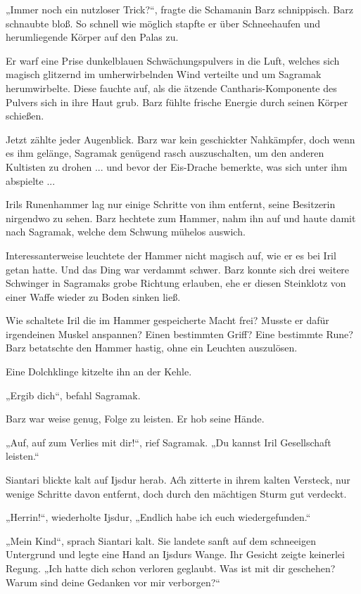 „Immer noch ein nutzloser Trick?“, fragte die Schamanin Barz schnippisch. Barz schnaubte bloß. So schnell wie möglich stapfte er über Schneehaufen und herumliegende Körper auf den Palas zu.

Er warf eine Prise dunkelblauen Schwächungspulvers in die Luft, welches sich magisch glitzernd im umherwirbelnden Wind verteilte und um Sagramak herumwirbelte. Diese fauchte auf, als die ätzende Cantharis-Komponente des Pulvers sich in ihre Haut grub. Barz fühlte frische Energie durch seinen Körper schießen.

Jetzt zählte jeder Augenblick. Barz war kein geschickter Nahkämpfer, doch wenn es ihm gelänge, Sagramak genügend rasch auszuschalten, um den anderen Kultisten zu drohen ... und bevor der Eis-Drache bemerkte, was sich unter ihm abspielte ...

Irils Runenhammer lag nur einige Schritte von ihm entfernt, seine Besitzerin nirgendwo zu sehen. Barz hechtete zum Hammer, nahm ihn auf und haute damit nach Sagramak, welche dem Schwung mühelos auswich.

Interessanterweise leuchtete der Hammer nicht magisch auf, wie er es bei Iril getan hatte. Und das Ding war verdammt schwer. Barz konnte sich drei weitere Schwinger in Sagramaks grobe Richtung erlauben, ehe er diesen Steinklotz von einer Waffe wieder zu Boden sinken ließ.

Wie schaltete Iril die im Hammer gespeicherte Macht frei? Musste er dafür irgendeinen Muskel anspannen? Einen bestimmten Griff? Eine bestimmte Rune? Barz betatschte den Hammer hastig, ohne ein Leuchten auszulösen.

Eine Dolchklinge kitzelte ihn an der Kehle.

„Ergib dich“, befahl Sagramak.

Barz war weise genug, Folge zu leisten. Er hob seine Hände.

„Auf, auf zum Verlies mit dir!“, rief Sagramak. „Du kannst Iril Gesellschaft leisten.“\bigskip







Siantari blickte kalt auf Ijsdur herab. Aćh zitterte in ihrem kalten Versteck, nur wenige Schritte davon entfernt, doch durch den mächtigen Sturm gut verdeckt.

„Herrin!“, wiederholte Ijsdur, „Endlich habe ich euch wiedergefunden.“

„Mein Kind“, sprach Siantari kalt. Sie landete sanft auf dem schneeigen Untergrund und legte eine Hand an Ijsdurs Wange. Ihr Gesicht zeigte keinerlei Regung. „Ich hatte dich schon verloren geglaubt. Was ist mit dir geschehen? Warum sind deine Gedanken vor mir verborgen?“


